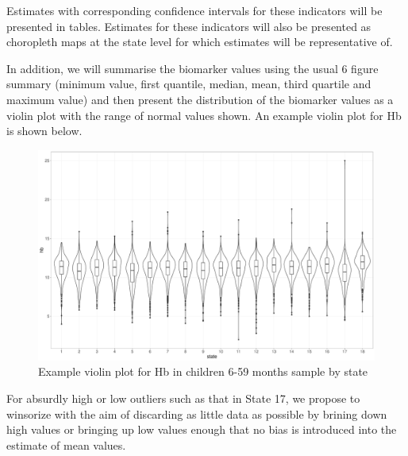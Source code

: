 \documentclass[12pt,a4paper]{article}
\begin{document}
Estimates with corresponding confidence intervals for these indicators will be presented in tables. Estimates for these indicators will also be presented as choropleth maps at the state level for which estimates will be representative of.

In addition, we will summarise the biomarker values using the usual 6 figure summary (minimum value, first quantile, median, mean, third quartile and maximum value) and then present the distribution of the biomarker values as a violin plot with the range of normal values shown. An example violin plot for Hb is shown below.

\begin{figure}[H]

{\centering \includegraphics{sudanMNindicatorsV0.2.3_files/figure-latex/violin-1} 

}

\caption{Example violin plot for Hb in children 6-59 months sample by state}\label{fig:violin}
\end{figure}

For absurdly high or low outliers such as that in State 17, we propose to winsorize with the aim of discarding as little data as possible by brining down high values or bringing up low values enough that no bias is introduced into the estimate of mean values.

\newpage

\renewcommand\refname{References}

\end{document}
